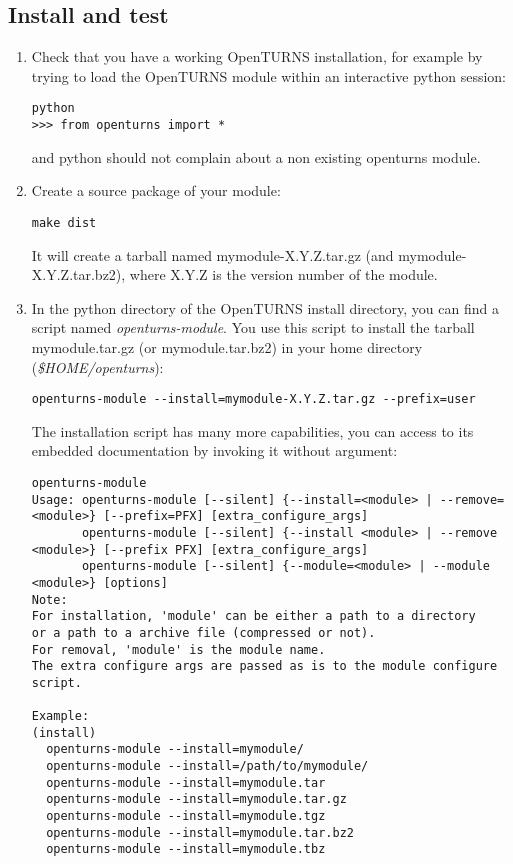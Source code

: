 \documentclass[11pt]{article}
\begin{document}
\subsection{Install and test}
\begin{enumerate}

\item Check that you have a working OpenTURNS installation, for example by trying to load the OpenTURNS module within an interactive python session:
\begin{verbatim}
python
>>> from openturns import *
\end{verbatim}
  and python should not complain about a non existing openturns module.

\item Create a source package of your module:
\begin{verbatim}
make dist
\end{verbatim}
  It will create a tarball named mymodule-X.Y.Z.tar.gz (and mymodule-X.Y.Z.tar.bz2), where X.Y.Z is the version number of the module.

\item In the python directory of the OpenTURNS install directory, you can find a script named {\itshape openturns-module}. You use this script to install the tarball mymodule.tar.gz (or mymodule.tar.bz2) in your home directory ({\itshape \$HOME/openturns}):
\begin{verbatim}
openturns-module --install=mymodule-X.Y.Z.tar.gz --prefix=user
\end{verbatim}
  The installation script has many more capabilities, you can access to its embedded documentation by invoking it without argument:
  \scriptsize
\begin{verbatim}
openturns-module
Usage: openturns-module [--silent] {--install=<module> | --remove=<module>} [--prefix=PFX] [extra_configure_args]
       openturns-module [--silent] {--install <module> | --remove <module>} [--prefix PFX] [extra_configure_args]
       openturns-module [--silent] {--module=<module> | --module <module>} [options]
Note:
For installation, 'module' can be either a path to a directory
or a path to a archive file (compressed or not).
For removal, 'module' is the module name.
The extra configure args are passed as is to the module configure
script.

Example:
(install)
  openturns-module --install=mymodule/
  openturns-module --install=/path/to/mymodule/
  openturns-module --install=mymodule.tar
  openturns-module --install=mymodule.tar.gz
  openturns-module --install=mymodule.tgz
  openturns-module --install=mymodule.tar.bz2
  openturns-module --install=mymodule.tbz


\end{verbatim}
\end{enumerate}
\end{document}
